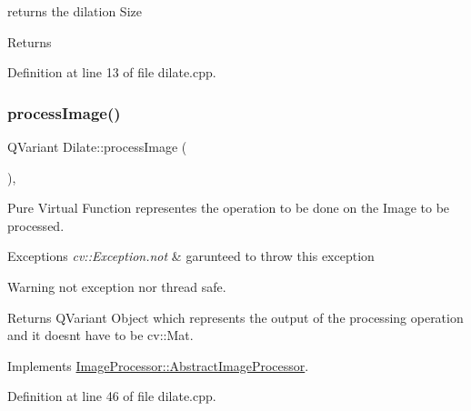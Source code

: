 returns the dilation Size 

\begin{DoxyReturn}{Returns}

\end{DoxyReturn}


Definition at line 13 of file dilate.\+cpp.

\mbox{\label{class_image_processor_1_1_dilate_ac4af4d83e97990416f1ccc6b80fd140b}} 
\subsubsection{\texorpdfstring{process\+Image()}{processImage()}}
{\footnotesize\ttfamily Q\+Variant Dilate\+::process\+Image (\begin{DoxyParamCaption}{ }\end{DoxyParamCaption})\hspace{0.3cm}{\ttfamily [override]}, {\ttfamily [virtual]}}



Pure Virtual Function representes the operation to be done on the Image to be processed. 


\begin{DoxyExceptions}{Exceptions}
{\em cv\+::\+Exception.\+not} & garunteed to throw this exception \\
\hline
\end{DoxyExceptions}
\begin{DoxyWarning}{Warning}
not exception nor thread safe. 
\end{DoxyWarning}
\begin{DoxyReturn}{Returns}
Q\+Variant Object which represents the output of the processing operation and it doesn\textquotesingle{}t have to be cv\+::\+Mat. 
\end{DoxyReturn}


Implements \hyperlink{class_image_processor_1_1_abstract_image_processor_ad033ae911918b0f6842b7b1d6cdd2b90}{Image\+Processor\+::\+Abstract\+Image\+Processor}.



Definition at line 46 of file dilate.\+cpp.

\mbox{\label{class_image_processor_1_1_dilate_addfbd49b040fc54c9a8985c764f4a144}} 
